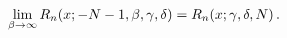 \[\lim_{\beta\to\infty}\mathop{R_{n}\/}\nolimits\!\left(x;-N-1,\beta,\gamma,%
\delta\right)=\mathop{R_{n}\/}\nolimits\!\left(x;\gamma,\delta,N\right).\]